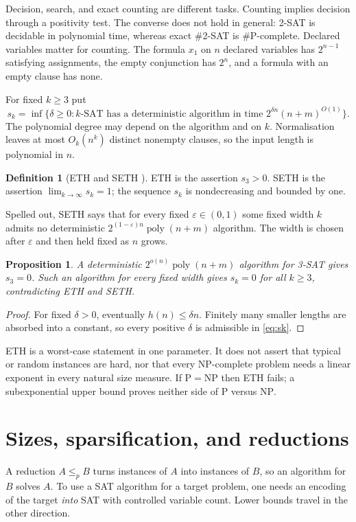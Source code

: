 \documentclass[11pt,reqno]{amsart}
\numberwithin{equation}{section}
\theoremstyle{plain}
\newtheorem{proposition}[theorem]{Proposition}
\theoremstyle{definition}
\newtheorem{definition}[theorem]{Definition}
\theoremstyle{remark}
\newcommand{\poly}{\operatorname{poly}}
\begin{document}
Decision, search, and exact counting are different tasks. Counting implies
decision through a positivity test. The converse does not hold in general:
2-SAT is decidable in polynomial time, whereas exact \#2-SAT is
$\#\mathrm P$-complete. Declared variables matter for counting. The formula
$x_1$ on $n$ declared variables has $2^{n-1}$ satisfying assignments, the
empty conjunction has $2^n$, and a formula with an empty clause has none.

For fixed $k\ge3$ put
\begin{equation}\label{eq:sk}
 s_k=\inf\{\delta\ge0:\text{$k$-SAT has a deterministic algorithm in time }
                 2^{\delta n}(n+m)^{O(1)}\}.
\end{equation}
The polynomial degree may depend on the algorithm and on $k$. Normalisation
leaves at most $O_k(n^k)$ distinct nonempty clauses, so the input length is
polynomial in $n$.

\begin{definition}[ETH and SETH \cite{IP,IPZ}]
ETH is the assertion $s_3>0$. SETH is the assertion $\lim_{k\to\infty}s_k=1$;
the sequence $s_k$ is nondecreasing and bounded by one.
\end{definition}
Spelled out, SETH says that for every fixed $\varepsilon\in(0,1)$ some fixed
width $k$ admits no deterministic $2^{(1-\varepsilon)n}\poly(n+m)$
algorithm. The width is chosen after $\varepsilon$ and then held fixed as $n$
grows.

\begin{proposition}\label{prop:refute}
A deterministic $2^{o(n)}\poly(n+m)$ algorithm for 3-SAT gives $s_3=0$. Such
an algorithm for every fixed width gives $s_k=0$ for all $k\ge3$,
contradicting ETH and SETH.
\end{proposition}
\begin{proof}
For fixed $\delta>0$, eventually $h(n)\le\delta n$. Finitely many smaller
lengths are absorbed into a constant, so every positive $\delta$ is
admissible in \eqref{eq:sk}.
\end{proof}

ETH is a worst-case statement in one parameter. It does not assert that
typical or random instances are hard, nor that every NP-complete problem
needs a linear exponent in every natural size measure. If
$\mathrm P=\mathrm{NP}$ then ETH fails; a subexponential upper bound proves
neither side of $\mathrm P$ versus $\mathrm{NP}$.

\section{Sizes, sparsification, and reductions}\label{sec:reductions}
A reduction $A\le_p B$ turns instances of $A$ into instances of $B$, so an
algorithm for $B$ solves $A$. To use a SAT algorithm for a target problem,
one needs an encoding of the target \emph{into} SAT with controlled variable
count. Lower bounds travel in the other direction.
\end{document}
